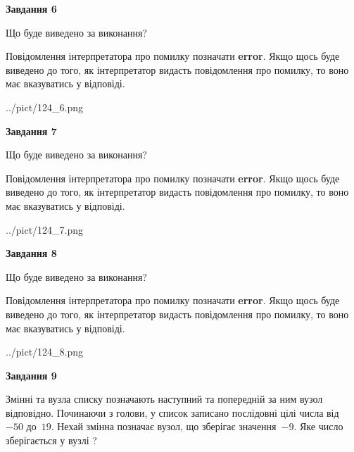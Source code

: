 \documentclass[12pt, ukrainian]{article}
\begin{document}
{\begin {large}
{\begin {center}\textbf{Завдання 6}\end {center}}\par
Що буде виведено за виконання?

Повідомлення інтерпретатора про помилку позначати \textbf{error}.
Якщо щось буде виведено до того, як інтерпретатор видасть повідомлення про помилку, 
то воно має вказуватись у відповіді. \par


\begin{center}
	{../pict/124_6.png}
\end{center}
\newpage

{\begin {center}\textbf{Завдання 7}\end {center}}\par
Що буде виведено за виконання?

Повідомлення інтерпретатора про помилку позначати \textbf{error}.
Якщо щось буде виведено до того, як інтерпретатор видасть повідомлення про помилку, 
то воно має вказуватись у відповіді. \par


\begin{center}
	{../pict/124_7.png}
\end{center}
\newpage

{\begin {center}\textbf{Завдання 8}\end {center}}\par
Що буде виведено за виконання?

Повідомлення інтерпретатора про помилку позначати \textbf{error}.
Якщо щось буде виведено до того, як інтерпретатор видасть повідомлення про помилку, 
то воно має вказуватись у відповіді. \par


\begin{center}
	{../pict/124_8.png}
\end{center}
\newpage

{\begin {center}\textbf{Завдання 9}\end {center}}\par
Змінні  та  вузла списку позначають наступний та попередній за ним вузол відповідно. Починаючи з голови, у список записано послідовні цілі числа від~$-50$ до~$19$. Нехай змінна  позначає вузол, що зберігає значення~$-9$.
Яке число зберігається у вузлі  ?\par
\newpage


\end{large}}
\end{document}
